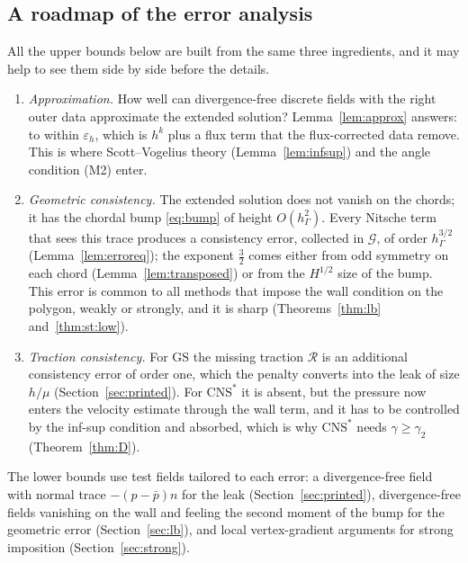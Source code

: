\documentclass[pdflatex,sn-mathphys-num]{sn-jnl}
\theoremstyle{thmstyleone}
\theoremstyle{thmstylethree}
\newcommand{\hG}{h_\Gamma}
\newcommand{\pbar}{\bar p}
\newcommand{\GS}{\mathrm{GS}}
\newcommand{\CNS}{\mathrm{CNS}^\ast}
\newcommand{\eps}{\varepsilon_h}
\newcommand{\Rc}{\mathcal R}
\newcommand{\Gc}{\mathcal G}
\begin{document}
\subsection{A roadmap of the error analysis}
All the upper bounds below are built from the same three ingredients, and it may help to see them side by side before the details.
\begin{enumerate}[label=(\roman*)]
\item \emph{Approximation.} How well can divergence-free discrete fields with the right outer data approximate the extended solution? Lemma~\ref{lem:approx} answers: to within $\eps$, which is $h^k$ plus a flux term that the flux-corrected data remove. This is where Scott--Vogelius theory (Lemma~\ref{lem:infsup}) and the angle condition (M2) enter.
\item \emph{Geometric consistency.} The extended solution does not vanish on the chords; it has the chordal bump \eqref{eq:bump} of height $O(\hG^2)$. Every Nitsche term that sees this trace produces a consistency error, collected in $\Gc$, of order $\hG^{3/2}$ (Lemma~\ref{lem:erroreq}); the exponent $\frac32$ comes either from odd symmetry on each chord (Lemma~\ref{lem:transposed}) or from the $H^{1/2}$ size of the bump. This error is common to all methods that impose the wall condition on the polygon, weakly or strongly, and it is sharp (Theorems~\ref{thm:lb} and~\ref{thm:st:low}).
\item \emph{Traction consistency.} For $\GS$ the missing traction $\Rc$ is an additional consistency error of order one, which the penalty converts into the leak of size $h/\mu$ (Section~\ref{sec:printed}). For $\CNS$ it is absent, but the pressure now enters the velocity estimate through the wall term, and it has to be controlled by the inf-sup condition and absorbed, which is why $\CNS$ needs $\gamma\ge\gamma_2$ (Theorem~\ref{thm:D}).
\end{enumerate}
The lower bounds use test fields tailored to each error: a divergence-free field with normal trace $-(p-\pbar)n$ for the leak (Section~\ref{sec:printed}), divergence-free fields vanishing on the wall and feeling the second moment of the bump for the geometric error (Section~\ref{sec:lb}), and local vertex-gradient arguments for strong imposition (Section~\ref{sec:strong}).
\end{document}
